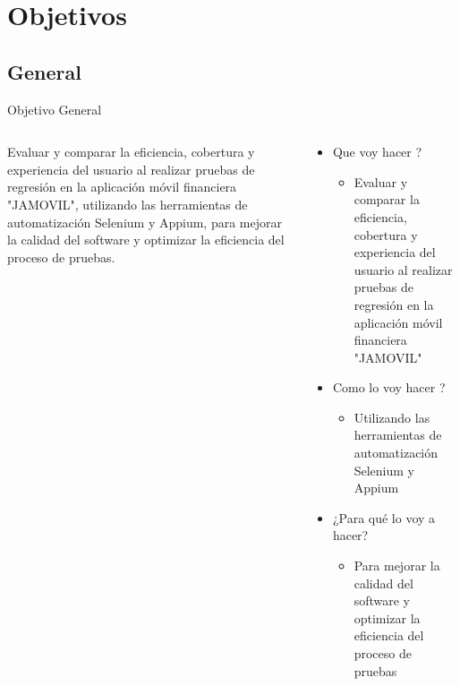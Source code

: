 \documentclass{beamer}
\begin{document}
\section{Objetivos}
\subsection{General}
\begin{frame}{Objetivo General }
  \begin{columns}
    \begin{column}{0.5\textwidth}
     Evaluar y comparar la eficiencia, cobertura y experiencia del usuario al realizar pruebas de regresión en la aplicación móvil financiera "JAMOVIL", utilizando las herramientas de automatización Selenium y Appium, para mejorar la calidad del software y optimizar la eficiencia del proceso de pruebas. 
   
    \end{column}
    \begin{column}{0.5\textwidth}
      \begin{itemize}
          \item Que voy hacer ?
          \begin{itemize}
              \item Evaluar y comparar la eficiencia, cobertura y experiencia del usuario al realizar pruebas de regresión en la aplicación móvil financiera "JAMOVIL"
          \end{itemize}
          \item Como lo voy hacer ?
          \begin{itemize}
              \item Utilizando las herramientas de automatización Selenium y Appium
          \end{itemize}
          \item ¿Para qué lo voy a hacer?
           \begin{itemize}
              \item Para mejorar la calidad del software y optimizar la eficiencia del proceso de pruebas 
          \end{itemize}         
          \end{itemize}
    \end{column}
  \end{columns}
\end{frame}
\end{document}
